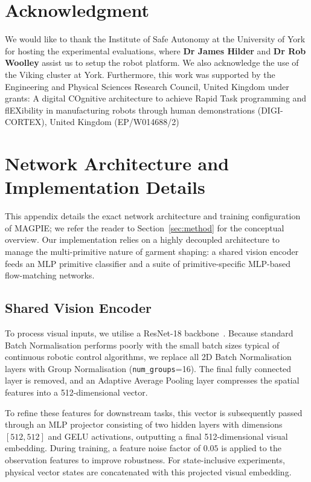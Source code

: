 \documentclass[journal]{IEEEtran}
\begin{document}
\section*{Acknowledgment}
We would like to thank the Institute of Safe Autonomy at the University of York for hosting the experimental evaluations, where \textbf{Dr James Hilder} and \textbf{Dr Rob Woolley} assist us to setup the robot platform. We also  acknowledge the use of the Viking cluster at York.  Furthermore, this work was supported by the Engineering and Physical Sciences Research Council, United Kingdom under grants: A digital COgnitive architecture to achieve Rapid Task programming and flEXibility in manufacturing robots through human demonstrations (DIGI-CORTEX), United Kingdom (EP/W014688/2)




\newpage

\appendices

\section{Network Architecture and Implementation Details}
\label{app:architecture}

This appendix details the exact network architecture and training configuration of MAGPIE; we refer the reader to Section~\ref{sec:method} for the conceptual overview. Our implementation relies on a highly decoupled architecture to manage the multi-primitive nature of garment shaping: a shared vision encoder feeds an MLP primitive classifier and a suite of primitive-specific MLP-based flow-matching networks.

\subsection{Shared Vision Encoder}
To process visual inputs, we utilise a ResNet-18 backbone~\cite{he2016deep}. Because standard Batch Normalisation performs poorly with the small batch sizes typical of continuous robotic control algorithms, we replace all 2D Batch Normalisation layers with Group Normalisation (\texttt{num\_groups}=16). The final fully connected layer is removed, and an Adaptive Average Pooling layer compresses the spatial features into a 512-dimensional vector.

To refine these features for downstream tasks, this vector is subsequently passed through an MLP projector consisting of two hidden layers with dimensions $[512, 512]$ and GELU activations, outputting a final 512-dimensional visual embedding. During training, a feature noise factor of $0.05$ is applied to the observation features to improve robustness. For state-inclusive experiments, physical vector states are concatenated with this projected visual embedding.
\end{document}

